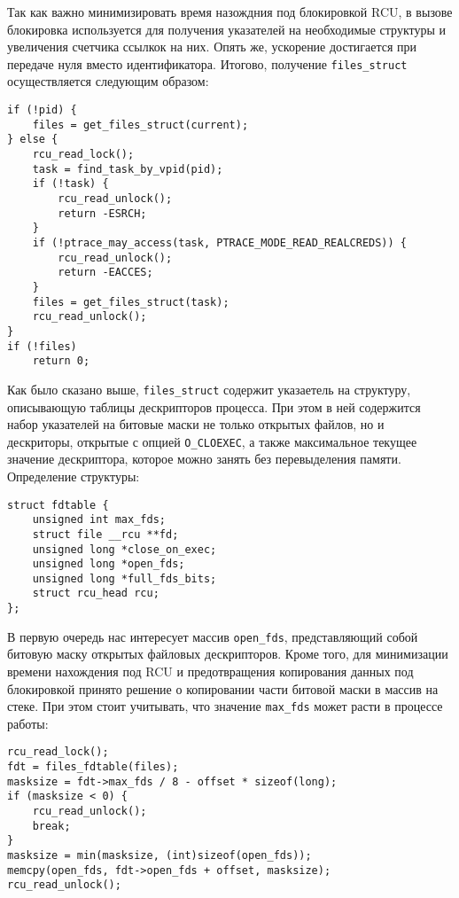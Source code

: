 Так как важно минимизировать время назождния под блокировкой RCU, в вызове
блокировка используется для получения указателей на необходимые структуры и
увеличения счетчика ссылкок на них. Опять же, ускорение достигается при передаче
нуля вместо идентификатора. Итогово, получение \texttt{files\_struct}
осуществляется следующим образом:
\medskip
\begin{lstlisting}[style=cstyle]
if (!pid) {
	files = get_files_struct(current);
} else {
	rcu_read_lock();
	task = find_task_by_vpid(pid);
	if (!task) {
		rcu_read_unlock();
		return -ESRCH;
	}
	if (!ptrace_may_access(task, PTRACE_MODE_READ_REALCREDS)) {
		rcu_read_unlock();
		return -EACCES;
	}
	files = get_files_struct(task);
	rcu_read_unlock();
}
if (!files)
	return 0;
\end{lstlisting}
\medskip

Как было сказано выше, \texttt{files\_struct} содержит указаетель на структуру,
описывающую таблицы дескрипторов процесса. При этом в ней содержится набор
указателей на битовые маски не только открытых файлов, но и дескриторы, открытые
с опцией \texttt{O\_CLOEXEC}, а также максимальное текущее значение дескриптора,
которое можно занять без перевыделения памяти. Определение структуры:
\medskip
\begin{lstlisting}[style=cstyle]
struct fdtable {
	unsigned int max_fds;
	struct file __rcu **fd;
	unsigned long *close_on_exec;
	unsigned long *open_fds;
	unsigned long *full_fds_bits;
	struct rcu_head rcu;
};
\end{lstlisting}
\medskip

В первую очередь нас интересует массив \texttt{open\_fds}, представляющий собой
битовую маску открытых файловых дескрипторов. Кроме того, для минимизации
времени нахождения под RCU и предотвращения копирования данных под блокировкой
принято решение о копировании части битовой маски в массив на стеке. При этом
стоит учитывать, что значение \texttt{max\_fds} может расти в процессе работы:
\medskip
\begin{lstlisting}[style=cstyle]
rcu_read_lock();
fdt = files_fdtable(files);
masksize = fdt->max_fds / 8 - offset * sizeof(long);
if (masksize < 0) {
	rcu_read_unlock();
	break;
}
masksize = min(masksize, (int)sizeof(open_fds));
memcpy(open_fds, fdt->open_fds + offset, masksize);
rcu_read_unlock();
\end{lstlisting}
\medskip

